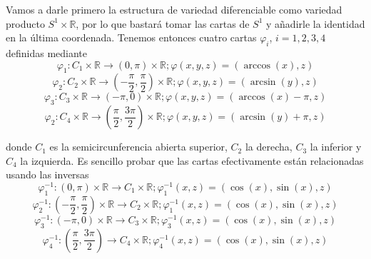 \documentclass[twoside, 11pt]{article}
\theoremstyle{definition}
\newcommand{\R}{\mathbb{R}}
\begin{document}
Vamos a darle primero la estructura de variedad diferenciable como variedad producto $S^1\times\R$, por lo que bastará tomar las cartas de $S^1$ y añadirle la identidad en la última coordenada. Tenemos entonces cuatro cartas $\varphi_i$, $i=1,2,3,4$ definidas mediante
\[
\varphi_1:C_1\times\R\to(0,\pi)\times\R; \varphi(x,y,z)=(\arccos(x),z)
\]
\[
\varphi_2:C_2\times\R\to\left(-\frac{\pi}{2},\frac{\pi}{2}\right)\times\R; \varphi(x,y,z)=(\arcsin(y),z)
\]
\[
\varphi_3:C_3\times\R\to(-\pi,0)\times\R; \varphi(x,y,z)=(\arccos(x)-\pi,z)
\]
\[
\varphi_2:C_4\times\R\to\left(\frac{\pi}{2},\frac{3\pi}{2}\right)\times\R; \varphi(x,y,z)=(\arcsin(y)+\pi,z)
\]

donde $C_1$ es la semicircunferencia abierta superior, $C_2$ la derecha, $C_3$ la inferior y $C_4$ la izquierda. Es sencillo probar que las cartas efectivamente están relacionadas usando las inversas 
\[
\varphi_1^{-1}:(0,\pi)\times\R\to C_1\times\R; \varphi_1^{-1}(x,z)=(\cos(x),\sin(x),z)
\]
\[
\varphi_2^{-1}:\left(-\frac{\pi}{2},\frac{\pi}{2}\right)\times\R\to C_2\times\R; \varphi_1^{-1}(x,z)=(\cos(x),\sin(x),z)
\]
\[\varphi_3^{-1}:(-\pi,0)\times\R\to C_3\times\R; \varphi_3^{-1}(x,z)=(\cos(x),\sin(x), z)\] 
\[\varphi_4^{-1}:\left(\frac{\pi}{2},\frac{3\pi}{2}\right)\to C_4\times\R;\varphi_4^{-1}(x,z)=(\cos(x),\sin(x),z)\]
\end{document}
